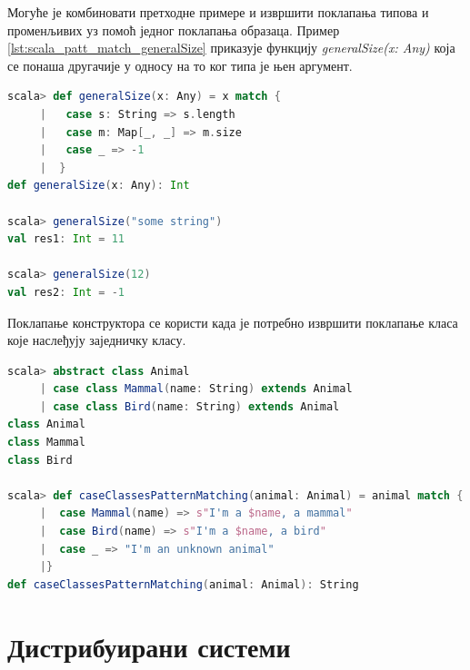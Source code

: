 \documentclass[12pt,oneside]{memoir}
\begin{document}
Могуће је комбиновати претходне примере и извршити поклапања типова и променљивих уз помоћ једног поклапања образаца. Пример \ref{lst:scala_patt_match_generalSize} приказује функцију \textit{generalSize(x: Any)} која се понаша другачије у односу на то ког типа је њен аргумент. \cite{scala_prog}

\begin{lstlisting}[language=Scala, caption={Пример поклапања типова и променљивих}, label={lst:scala_patt_match_generalSize}]
scala> def generalSize(x: Any) = x match {
     |   case s: String => s.length
     |   case m: Map[_, _] => m.size
     |   case _ => -1
     |  }
def generalSize(x: Any): Int

scala> generalSize("some string")
val res1: Int = 11

scala> generalSize(12)
val res2: Int = -1
\end{lstlisting}

Поклапање конструктора се користи када је потребно извршити поклапање класа које наслеђују заједничку класу. 

\begin{lstlisting}[language=Scala, caption={Поклапање конструктора}, label={lst:scala_patt_match_constr_match_example}]
scala> abstract class Animal
     | case class Mammal(name: String) extends Animal
     | case class Bird(name: String) extends Animal
class Animal
class Mammal
class Bird

scala> def caseClassesPatternMatching(animal: Animal) = animal match {
     |  case Mammal(name) => s"I'm a $name, a mammal"
     |  case Bird(name) => s"I'm a $name, a bird"
     |  case _ => "I'm an unknown animal"
     |}
def caseClassesPatternMatching(animal: Animal): String
\end{lstlisting}



\chapter{Дистрибуирани системи}
\label{chp:dist_sis}
\end{document}
